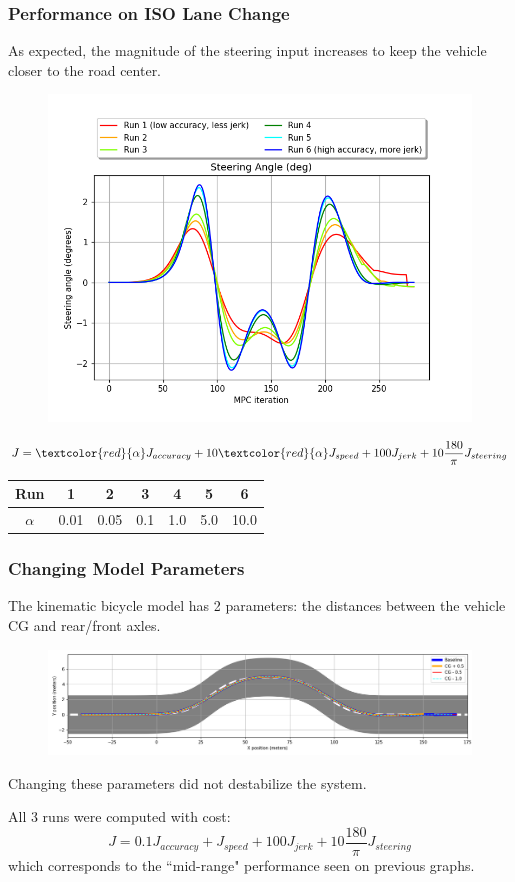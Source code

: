 \documentclass{beamer}
\begin{document}
\begin{frame}
\frametitle{Performance on ISO Lane Change}

As expected, the magnitude of the steering input increases to keep the vehicle closer to the road center.
\vspace{-0.5em}
\begin{figure}
	\includegraphics[width=0.6\linewidth]{figures/steering_angle.png}
\end{figure}
\vspace{-1.0em}

\small
$$J = \textcolor{red}{\alpha} J_{accuracy} + 10\textcolor{red}{\alpha} J_{speed} + 100 J_{jerk} + 10\frac{180}{\pi} J_{steering}$$

\begin{table}
\begin{tabular}{c|cccccc}
Run & 1 & 2 & 3 & 4 & 5 & 6
\\\hline
$\alpha$ & 0.01 & 0.05 & 0.1 & 1.0 & 5.0 & 10.0
\end{tabular}
\end{table}
\normalsize
\end{frame}


\begin{frame}
\frametitle{Changing Model Parameters}

The kinematic bicycle model has 2 parameters: the distances between the vehicle CG and rear/front axles.

\vspace{-0.5em}
\begin{figure}
	\centering
	\includegraphics[width=1.0\linewidth]{figures/road_paths_cg.png}
\end{figure}


Changing these parameters did not destabilize the system.

All 3 runs were computed with cost:
$$J = 0.1J_{accuracy} + J_{speed} + 100J_{jerk} + 10\frac{180}{\pi} J_{steering}$$
which corresponds to the ``mid-range" performance seen on previous graphs.
\end{frame}
\end{document}
